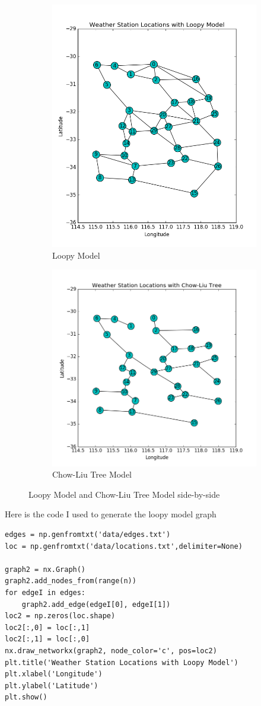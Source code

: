 \documentclass[twoside,11pt]{article}
\theoremstyle{definition}
\begin{document}
\begin{figure}[h]
\centering
\begin{subfigure}{.5\textwidth}
  \centering
  \includegraphics[width=3 in]{loopyModelFigure2.png}
  \caption{Loopy Model}
\end{subfigure}%
\begin{subfigure}{.5\textwidth}
  \centering
  \includegraphics[width=3 in]{chowLiuTreeFigure2.png}
  \caption{Chow-Liu Tree Model}
\end{subfigure}
\caption{Loopy Model and Chow-Liu Tree Model side-by-side}
\end{figure}

Here is the code I used to generate the loopy model graph

\begin{lstlisting}
edges = np.genfromtxt('data/edges.txt')
loc = np.genfromtxt('data/locations.txt',delimiter=None)

graph2 = nx.Graph()
graph2.add_nodes_from(range(n))
for edgeI in edges:
    graph2.add_edge(edgeI[0], edgeI[1])
loc2 = np.zeros(loc.shape)
loc2[:,0] = loc[:,1]
loc2[:,1] = loc[:,0]
nx.draw_networkx(graph2, node_color='c', pos=loc2)
plt.title('Weather Station Locations with Loopy Model')
plt.xlabel('Longitude')
plt.ylabel('Latitude')
plt.show()
\end{lstlisting}
\end{document}
